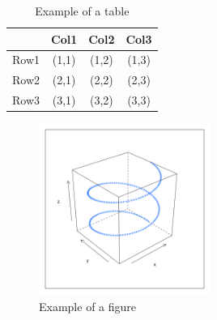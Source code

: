\documentclass[letterpaper, 10 pt, conference]{IEEEconf}
\begin{document}

\begin{table}[h!]
\begin{center}
\begin{tabular}{||c | c | c | c||} 
\hline
  & Col1 & Col2 & Col3 \\ [0.5ex]
\hline\hline
Row1 & (1,1) & (1,2) & (1,3) \\ 
\hline
Row2 & (2,1) & (2,2) & (2,3) \\
\hline
Row3 & (3,1) & (3,2) & (3,3) \\
\hline
\end{tabular}
\caption{Example of a table}
\label{tbl:example}
\end{center}
\end{table}

\begin{figure}[h!]
\centering
\includegraphics[width=0.5\textwidth]{spiral.png}
\caption{Example of a figure}
\label{fig:example}
\end{figure} 
\end{document}
